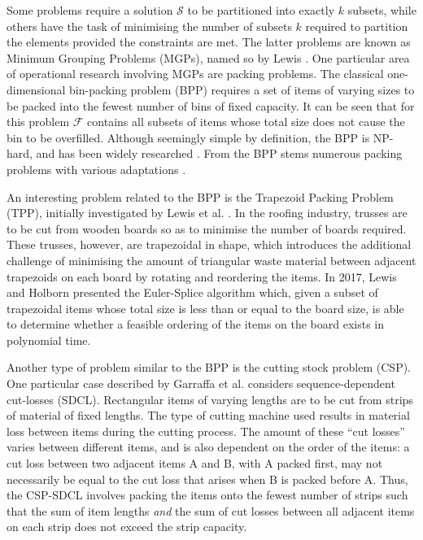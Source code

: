 \documentclass{elsarticle}
\begin{document}
Some problems require a solution $\mathcal{S}$ to be partitioned into exactly $k$ subsets, while others have the task of minimising the number of subsets $k$ required to partition the elements provided the constraints are met. The latter problems are known as Minimum Grouping Problems (MGPs), named so by Lewis \cite{lewis2009}. One particular area of operational research involving MGPs are packing problems. The classical one-dimensional bin-packing problem (BPP) requires a set of items of varying sizes to be packed into the fewest number of bins of fixed capacity. It can be seen that for this problem $\mathcal{F}$ contains all subsets of items whose total size does not cause the bin to be overfilled. Although seemingly simple by definition, the BPP is NP-hard, and has been widely researched \cite{coffman1984, decarvalho1999, fleszar2002}. From the BPP stems numerous packing problems with various adaptations \cite{coffman1987, haouari2009}.

An interesting problem related to the BPP is the Trapezoid Packing Problem (TPP), initially investigated by Lewis et al. \cite{lewis2011}. In the roofing industry, trusses are to be cut from wooden boards so as to minimise the number of boards required. These trusses, however, are trapezoidal in shape, which introduces the additional challenge of minimising the amount of triangular waste material between adjacent trapezoids on each board by rotating and reordering the items. In 2017, Lewis and Holborn \cite{lewis2017} presented the Euler-Splice algorithm which, given a subset of trapezoidal items whose total size is less than or equal to the board size, is able to determine whether a feasible ordering of the items on the board exists in polynomial time.

Another type of problem similar to the BPP is the cutting stock problem (CSP). One particular case described by Garraffa et al. \cite{garraffa2016} considers sequence-dependent cut-losses (SDCL). Rectangular items of varying lengths are to be cut from strips of material of fixed lengths. The type of cutting machine used results in material loss between items during the cutting process. The amount of these ``cut losses'' varies between different items, and is also dependent on the order of the items: a cut loss between two adjacent items A and B, with A packed first, may not necessarily be equal to the cut loss that arises when B is packed before A. Thus, the CSP-SDCL involves packing the items onto the fewest number of strips such that the sum of item lengths \emph{and} the sum of cut losses between all adjacent items on each strip does not exceed the strip capacity.
\end{document}
